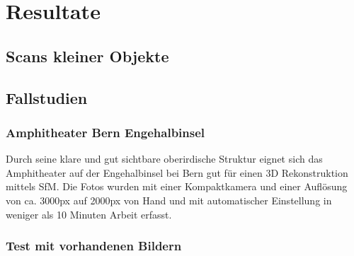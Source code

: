 \chapter{Resultate}

	\section{Scans kleiner Objekte}
	
	\section{Fallstudien}\label{res:fall}
		
		\subsection{Amphitheater Bern Engehalbinsel}
			Durch seine klare und gut sichtbare oberirdische Struktur eignet sich das Amphitheater auf der Engehalbinsel bei Bern gut für einen 3D Rekonstruktion mittels SfM.
			Die Fotos wurden mit einer Kompaktkamera und einer Auflösung von ca. 3000px auf 2000px von Hand und mit automatischer Einstellung in weniger als 10 Minuten Arbeit erfasst. 
		\subsection{Test mit vorhandenen Bildern} \label{res:test_vorhandene_bilder}